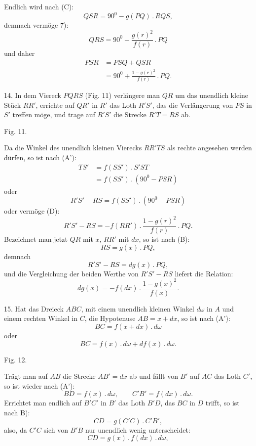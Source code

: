 %
\noindent Endlich wird nach (C):
\[
QSR = 90^{0} - g(PQ) \,.\, RQS,
\]
demnach vermöge 7):
\[
QRS = 90^{0} - \frac{g(r)^2}{f(r)} \,.\, PQ
\]
und daher
\[
\tag*{(D)} \begin{aligned}PSR &= PSQ + QSR\\ &= 90^{0} + \frac{1 - g(r)^2}{f(r)} \,.\, PQ.\end{aligned}
\]

14. In dem Viereck $PQRS$ (Fig. 11) verlängere man $QR$ um das unendlich kleine
Stück $RR'$, errichte auf $QR'$ in $R'$ das Loth $R'S'$, das die Verlängerung von
$PS$ in $S'$ treffen möge, und trage auf $R'S'$ die Strecke $R'T = RS$ ab.

\begin{center}\begin{minipage}{\linewidth}\centering


Fig. 11.
\end{minipage}\end{center}

Da die Winkel des unendlich kleinen Vierecks $RR'TS$ als rechte angesehen werden
dürfen, so ist nach (A'):
\[
\begin{aligned}TS' &= f(SS') \,.\, S'ST\\ &= f(SS') \,.\, (90^{0} - PSR)\end{aligned}
\]
oder
\[
R'S' - RS = f(SS') \,.\, (90^{0} - PSR)
\]
oder vermöge (D):
\[
\tag*{8)} R'S' - RS = -f(RR') \,.\, \frac{1 - g(r)^2}{f(r)} \,.\, PQ.
\]
Bezeichnet man jetzt $QR$ mit $x$, $RR'$ mit $dx$, so ist nach (B):
\[
RS = g(x) \,.\, PQ,
\]
demnach
\[
\tag*{9)} R'S' - RS = dg(x) \,.\, PQ,
\]
und die Vergleichung der beiden Werthe von $R'S' - RS$ liefert die Relation:
\[
\tag*{(E)} dg(x) = -f(dx) \,.\, \frac{1 - g(x)^2}{f(x)}.
\]

15. Hat das Dreieck $ABC$, mit einem unendlich kleinen Winkel $d\omega$ in $A$
und einem rechten Winkel in $C$, die Hypotenuse $AB = x + dx$, so ist nach (A'):
\[
BC = f(x + dx) \,.\, d\omega
\]
oder
\[
\tag*{10)} BC = f(x) \,.\, d\omega + df(x) \,.\, d\omega.
\]
\begin{center}\begin{minipage}{\linewidth}\centering


Fig. 12.
\end{minipage}\end{center}

Trägt man auf $AB$ die Strecke $AB' = dx$ ab und fällt von $B'$ auf $AC$ das Loth
$C'$, so ist wieder nach (A'):
\[
BD = f(x) \,.\, d\omega, \qquad C'B' = f(dx) \,.\, d\omega.
\]
Errichtet man endlich auf $B'C'$ in $B'$ das Loth $B'D$, das $BC$ in $D$ trifft,
so ist nach B):
\[
CD = g(C'C) \,.\, C'B',
\]
also, da $C'C$ sich von $B'B$ nur unendlich wenig unterscheidet:
\[
\tag*{11)} CD = g(x) \,.\, f(dx) \,.\, d\omega,
\]

